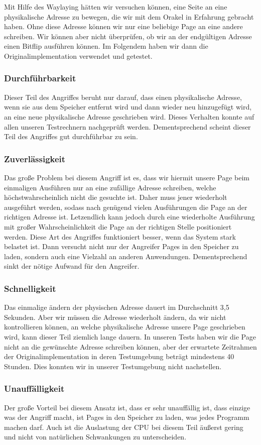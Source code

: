 Mit Hilfe des Waylaying hätten wir versuchen können, eine Seite an eine physikalische Adresse zu bewegen, die wir mit dem Orakel in Erfahrung gebracht haben. Ohne diese Adresse können wir nur eine beliebige Page an eine andere schreiben. Wir können aber nicht überprüfen, ob wir an der endgültigen Adresse einen Bitflip ausführen können. Im Folgendem haben wir dann die Originalimplementation \cite{git-rowhammer} verwendet und getestet.

\subsubsection{Durchführbarkeit}
Dieser Teil des Angriffes beruht nur darauf, dass einen physikalische Adresse, wenn sie aus dem Speicher entfernt wird und dann wieder neu hinzugefügt wird, an eine neue physikalische Adresse geschrieben wird. Dieses Verhalten konnte auf allen unseren Testrechnern nachgeprüft werden. Dementsprechend scheint dieser Teil des Angriffes gut durchführbar zu sein.
\subsubsection{Zuverlässigkeit}
Das große Problem bei diesem Angriff ist es, dass wir hiermit unsere Page beim einmaligen Ausführen nur an eine zufällige Adresse schreiben, welche höchstwahrscheinlich nicht die gesuchte ist. Daher muss jener wiederholt ausgeführt werden, sodass nach genügend vielen Ausführungen die Page an der richtigen Adresse ist. Letzendlich kann jedoch durch eine wiederholte Ausführung mit großer Wahrscheinlichkeit die Page an der richtigen Stelle positioniert werden.
Diese Art des Angriffes funktioniert besser, wenn das System stark belastet ist. Dann versucht nicht nur der Angreifer Pages in den Speicher zu laden, sondern auch eine Vielzahl an anderen Anwendungen. Dementsprechend sinkt der nötige Aufwand für den Angreifer.
\subsubsection{Schnelligkeit}
Das einmalige ändern der physischen Adresse dauert im Durchschnitt 3,5 Sekunden. Aber wir müssen die Adresse wiederholt ändern, da wir nicht kontrollieren können, an welche physikalische Adresse unsere Page geschrieben wird, kann dieser Teil ziemlich lange dauern. In unseren Tests haben wir die Page nicht an die gewünschte Adresse schreiben können, aber der erwartete Zeitrahmen der Originalimplementation in deren Testumgebung beträgt mindestens 40 Stunden. Dies konnten wir in unserer Testumgebung nicht nachstellen.
\subsubsection{Unauffälligkeit}
Der große Vorteil bei diesem Ansatz ist, dass er sehr unauffällig ist, dass einzige was der Angriff macht, ist Pages in den Speicher zu laden, was jedes Programm machen darf. Auch ist die Auslastung der CPU bei diesem Teil äußerst gering und nicht von natürlichen Schwankungen zu unterscheiden.